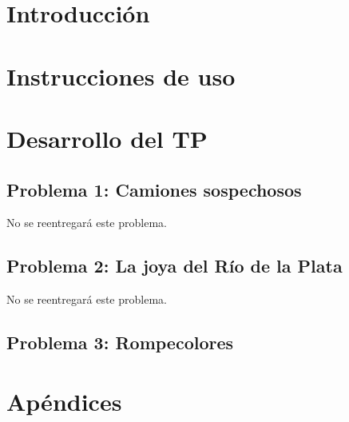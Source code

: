 \documentclass[11pt, a4paper, twoside]{article}
\begin{document}
{}
\newpage{\pagestyle{empty}\cleardoublepage}
\setcounter{page}{1}

\newpage{\pagestyle{empty}\tableofcontents\cleardoublepage}

\begin{TP1}
\section{Introducción}\label{sec:introduccion}

\newpage
\section{Instrucciones de uso}\label{sec:instrucciones}

\newpage

\section{Desarrollo del TP}\label{sec:desarrollo}
	
	\subsection{Problema 1: Camiones sospechosos}\label{subsec:problema1}
  No se reentregará este problema.
	\newpage
	
	\subsection{Problema 2: La joya del Río de la Plata}\label{subsec:problema2}
  No se reentregará este problema.
	\newpage
	
	\subsection{Problema 3: Rompecolores}
	\label{subsec:problema3}
	\newpage

\section{Apéndices}
	

\end{TP1}
\end{document}
